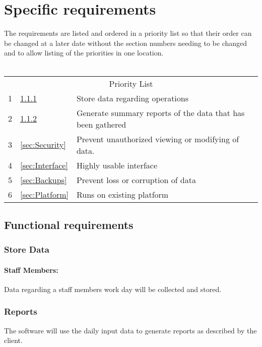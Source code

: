 \documentclass[12pt]{article}
\begin{document}
\section{Specific requirements}
The requirements are listed and ordered in a priority list so that their order can be changed at a later date without the section numbers needing to be changed and to allow listing of the priorities in one location.\\
\\
\begin{tabular}{l | l p{5.25in}}
\multicolumn{3}{c}{Priority List}\\
1 &\ref{sec:Store Data}			& Store data regarding operations \\
2 &\ref{sec:Reports}			& Generate summary reports of the data that has been gathered\\
3 &\ref{sec:Security}			& Prevent unauthorized viewing or modifying of data. \\
4 &\ref{sec:Interface}			& Highly usable interface\\ 
5 &\ref{sec:Backups}			& Prevent loss or corruption of data\\
6 &\ref{sec:Platform}			& Runs on existing platform\\
\end{tabular}
\begin{comment}
The first 2 are to be considered absolutely critical. The software cannot be considered useful if those features are absent.

What are the security implications of storing identifiable time sheet info for employees??
\end{comment}

\subsection{Functional requirements}
 
\subsubsection{Store Data}\label{sec:Store Data}
\paragraph{Staff Members:} Data regarding a staff members work day will be collected and stored.

\subsubsection{Reports}\label{sec:Reports}
The software will use the daily input data to generate reports as described by the client.
\end{document}
